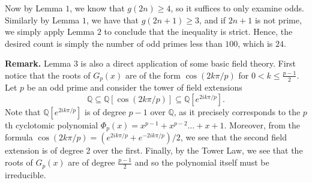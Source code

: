 \documentclass[10pt]{article}
\begin{document}
\begin{enumerate}
\par Now by Lemma $1$, we know that $g(2n)\geq 4$, so it suffices to only examine odds. Similarly by Lemma $1$, we have that $g(2n+1)\geq 3$, and if $2n+1$ is not prime, we simply apply Lemma $2$ to conclude that the inequality is strict. Hence, the desired count is simply the number of odd primes less than $100$, which is $\boxed{24}$.

\vspace{6pt}

\textbf{Remark.} Lemma 3 is also a direct application of some basic field theory. First notice that the roots of $G_p(x)$ are of the form $\cos(2k\pi/p)$ for $0<k\leq \frac{p-1}{2}$. Let $p$ be an odd prime and consider the tower of field extensions $$\mathbb{Q} \subseteq \mathbb{Q}[\cos(2k\pi/p)] \subseteq \mathbb{Q}[e^{2ik\pi/p}]. $$ Note that $\mathbb{Q}[e^{2ik\pi/p}]$ is of degree $p-1$ over $\mathbb{Q}$, as it precisely corresponds to the $p$th cyclotomic polynomial $\Phi_p(x)=x^{p-1}+x^{p-2}\dots+x+1$. Moreover, from the formula $\cos(2k\pi/p)=(e^{2ik\pi/p}+e^{-2ik\pi/p})/2$, we see that the second field extension is of degree 2 over the first. Finally, by the Tower Law, we see that the roots of $G_p(x)$ are of degree $\frac{p-1}{2}$ and so the polynomial itself must be irreducible. 

\end{enumerate}
\end{document}
